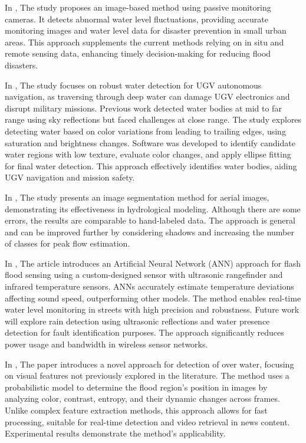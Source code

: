 In \cite{rel2}, The study proposes an image-based method using passive monitoring cameras. It detects abnormal water level fluctuations, providing accurate monitoring images and water level data for disaster prevention in small urban areas. This approach supplements the current methods relying on in situ and remote sensing data, enhancing timely decision-making for reducing flood disasters.


In \cite{rel3}, The study focuses on robust water detection for UGV autonomous navigation, as traversing through deep water can damage UGV electronics and disrupt military missions. Previous work detected water bodies at mid to far range using sky reflections but faced challenges at close range. The study explores detecting water based on color variations from leading to trailing edges, using saturation and brightness changes. Software was developed to identify candidate water regions with low texture, evaluate color changes, and apply ellipse fitting for final water detection. This approach effectively identifies water bodies, aiding UGV navigation and mission safety.

In \cite{rel4}, The study presents an image segmentation method for aerial images, demonstrating its effectiveness in hydrological modeling. Although there are some errors, the results are comparable to hand-labeled data. The approach is general and can be improved further by considering shadows and increasing the number of classes for peak flow estimation.

In \cite{rel5}, The article introduces an Artificial Neural Network (ANN) approach for flash flood sensing using a custom-designed sensor with ultrasonic rangefinder and infrared temperature sensors. ANNs accurately estimate temperature deviations affecting sound speed, outperforming other models. The method enables real-time water level monitoring in streets with high precision and robustness. Future work will explore rain detection using ultrasonic reflections and water presence detection for fault identification purposes. The approach significantly reduces power usage and bandwidth in wireless sensor networks.
    
In \cite{rel6}, The paper introduces a novel approach for detection of over water, focusing on visual features not previously explored in the literature. The method uses a probabilistic model to determine the flood region's position in images by analyzing color, contrast, entropy, and their dynamic changes across frames. Unlike complex feature extraction methods, this approach allows for fast processing, suitable for real-time detection and video retrieval in news content. Experimental results demonstrate the method's applicability.


